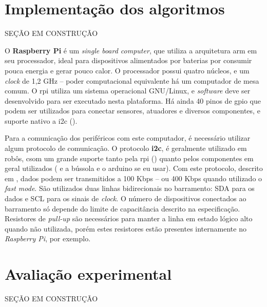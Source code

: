 

\section{Implementação dos algoritmos}
\label{sec:software}

SEÇÃO EM CONSTRUÇÃO


O \textbf{Raspberry Pi} é um \emph{single board computer}, que utiliza a arquitetura \acrshort{arm} em seu processador, ideal para dispositivos alimentados por baterias por consumir pouca energia e gerar pouco calor. O processador possui quatro núcleos, e um \emph{clock} de 1,2 GHz -- poder computacional equivalente há um computador de mesa comum. O \acrshort{rpi} utiliza um sistema operacional GNU/Linux, e \emph{software} deve ser desenvolvido para ser executado nesta plataforma. Há ainda 40 pinos de \acrshort{gpio} que podem ser utilizados para conectar sensores, atuadores e diversos componentes, e suporte nativo a \acrshort{i2c} (\cite{upton2014raspberry}).


Para a comunicação dos periféricos com este computador, é necessário utilizar algum protocolo de comunicação. O protocolo \textbf{\acrlong{i2c}}, é geralmente utilizado em robôs, csom um grande suporte tanto pela \acrshort{rpi} (\cite{upton2014raspberry}) quanto pelos componentes em geral utilizados (\cite{MPU6050} e a bússola e o arduino se eu usar). Com este protocolo, descrito em \cite{semiconductors2000i2c}, dados podem ser transmitidos a 100 Kbps -- ou 400 Kbps quando utilizado o \emph{fast mode}. São utilizados duas linhas bidirecionais no barramento: SDA para os dados e SCL para os sinais de \emph{clock}. O número de dispositivos conectados ao barramento só depende do limite de capacitância descrito na especificação. Resistores de \emph{pull-up} são necessários para manter a linha em estado lógico alto quando não utilizada, porém estes resistores estão presentes internamente no \emph{Raspberry Pi}, por exemplo.


\section{Avaliação experimental}
\label{sec:experimental}

SEÇÃO EM CONSTRUÇÃO
